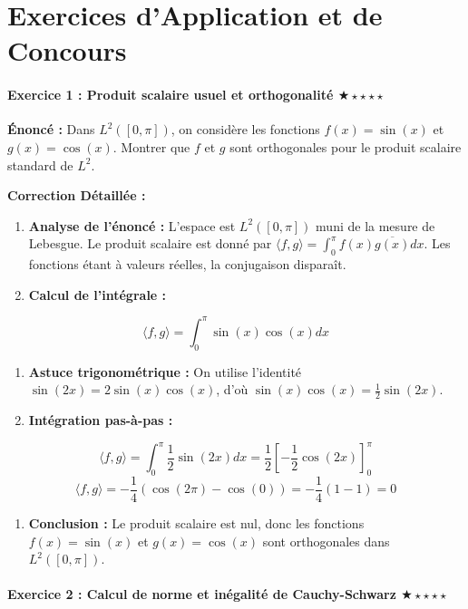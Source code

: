 \documentclass[11pt,a4paper]{article}
\begin{document}
\newpage
\part{Exercices d'Application et de Concours}
\subsection*{Exercice 1 : Produit scalaire usuel et orthogonalité \quad $\bigstar\star\star\star\star$}

\textbf{Énoncé :}
Dans $L^2([0, \pi])$, on considère les fonctions $f(x) = \sin(x)$ et $g(x) = \cos(x)$. Montrer que $f$ et $g$ sont orthogonales pour le produit scalaire standard de $L^2$.

\textbf{Correction Détaillée :}
\begin{enumerate}
\item \textbf{Analyse de l'énoncé :} L'espace est $L^2([0, \pi])$ muni de la mesure de Lebesgue. Le produit scalaire est donné par $\langle f, g \rangle = \int_0^\pi f(x)\overline{g(x)}dx$. Les fonctions étant à valeurs réelles, la conjugaison disparaît.

\item \textbf{Calcul de l'intégrale :}
\end{enumerate}
   $$ \langle f, g \rangle = \int_0^\pi \sin(x)\cos(x) dx $$
\begin{enumerate}
\item \textbf{Astuce trigonométrique :} On utilise l'identité $\sin(2x) = 2\sin(x)\cos(x)$, d'où $\sin(x)\cos(x) = \frac{1}{2}\sin(2x)$.

\item \textbf{Intégration pas-à-pas :}
\end{enumerate}
   $$ \langle f, g \rangle = \int_0^\pi \frac{1}{2}\sin(2x) dx = \frac{1}{2} \left[ -\frac{1}{2}\cos(2x) \right]_0^\pi $$
   $$ \langle f, g \rangle = -\frac{1}{4} ( \cos(2\pi) - \cos(0) ) = -\frac{1}{4} (1 - 1) = 0 $$
\begin{enumerate}
\item \textbf{Conclusion :} Le produit scalaire est nul, donc les fonctions $f(x) = \sin(x)$ et $g(x) = \cos(x)$ sont orthogonales dans $L^2([0, \pi])$.
\end{enumerate}



\subsection*{Exercice 2 : Calcul de norme et inégalité de Cauchy-Schwarz \quad $\bigstar\star\star\star\star$}
\end{document}
